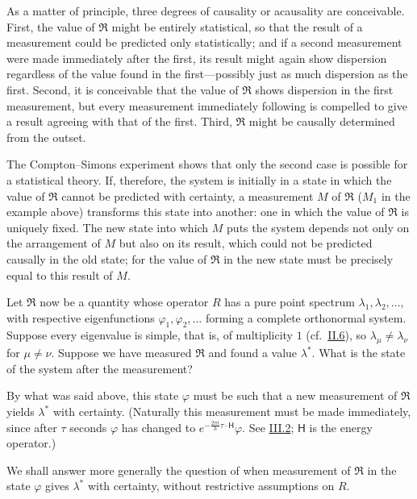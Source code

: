 \documentclass[fontsize=13pt,twoside,openany,headings=normal,parskip=false,bookmarkpackage=false,DIV=calc]{scrbook}
\begin{document}
As a matter of principle, three degrees of causality or acausality are conceivable. First, the value of $\mathfrak R$ might be entirely statistical, so that the result of a measurement could be predicted only statistically; and if a second measurement were made immediately after the first, its result might again show dispersion regardless of the value found in the first---possibly just as much dispersion as the first. Second, it is conceivable that
\hypertarget{origpage-112}{}%
the value of $\mathfrak R$ shows dispersion in the first measurement, but every measurement immediately following is compelled to give a result agreeing with that of the first. Third, $\mathfrak R$ might be causally determined from the outset.

The Compton--Simons experiment shows that only the second case is possible for a statistical theory. If, therefore, the system is initially in a state in which the value of $\mathfrak R$ cannot be predicted with certainty, a measurement $M$ of $\mathfrak R$ ($M_1$ in the example above) transforms this state into another: one in which the value of $\mathfrak R$ is uniquely fixed. The new state into which $M$ puts the system depends not only on the arrangement of $M$ but also on its result, which could not be predicted causally in the old state; for the value of $\mathfrak R$ in the new state must be precisely equal to this result of $M$.

Let $\mathfrak R$ now be a quantity whose operator $R$ has a pure point spectrum $\lambda_1,\lambda_2,\ldots$, with respective eigenfunctions $\varphi_1,\varphi_2,\ldots$ forming a complete orthonormal system. Suppose every eigenvalue is simple, that is, of multiplicity $1$ (cf.\ \hyperref[sec:II.6]{II.6}), so $\lambda_\mu\ne\lambda_\nu$ for $\mu\ne\nu$. Suppose we have measured $\mathfrak R$ and found a value $\lambda^*$. What is the state of the system after the measurement?

By what was said above, this state $\varphi$ must be such that a new measurement of $\mathfrak R$ yields $\lambda^*$ with certainty. (Naturally this measurement must be made immediately, since after $\tau$ seconds $\varphi$ has changed to $e^{-\frac{2\pi i}h\tau\cdot\mathsf H}\varphi$. See \hyperref[sec:III.2]{III.2}; $\mathsf H$ is the energy operator.)

We shall answer more generally the question of when measurement of $\mathfrak R$ in the state $\varphi$ gives $\lambda^*$ with certainty, without restrictive assumptions on $R$.
\end{document}
